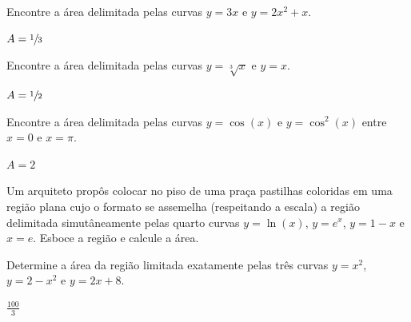 \begin{exercises*}
\begin{exercise}
Encontre a área delimitada pelas curvas $y=3x$ e $y=2x^2+x$.
\begin{answer}
  $A= \sfrac{1}{3}$
\end{answer}
\end{exercise}

\begin{exercise}
Encontre a área delimitada pelas curvas $y=\sqrt[3]{x}$ e $y=x$.
\begin{answer}
  $A= \sfrac{1}{2}$
\end{answer}
\end{exercise}

\begin{exercise}
Encontre a área delimitada pelas curvas $y= \cos(x)$ e $y= \cos^2(x)$
entre $x=0$ e $x=\pi$.
\begin{answer}
  $A= 2$
\end{answer}
\end{exercise}

\begin{exercise}
Um arquiteto propôs colocar no piso de uma praça pastilhas coloridas em uma
região plana cujo o formato se assemelha (respeitando a escala) a região
delimitada simutâneamente pelas quarto curvas $y= \ln(x)$, $y=e^x$,
$y=1-x$ e $x=e$. Esboce a região e calcule a área.
\end{exercise}

\begin{exercise}
Determine a área da região limitada exatamente pelas três curvas
$y =x^2$, $ y = 2- x^2$ e $y = 2x + 8$.
\begin{answer}
  $\frac{100}{3}$
\end{answer}
\end{exercise}


\end{exercises*}
